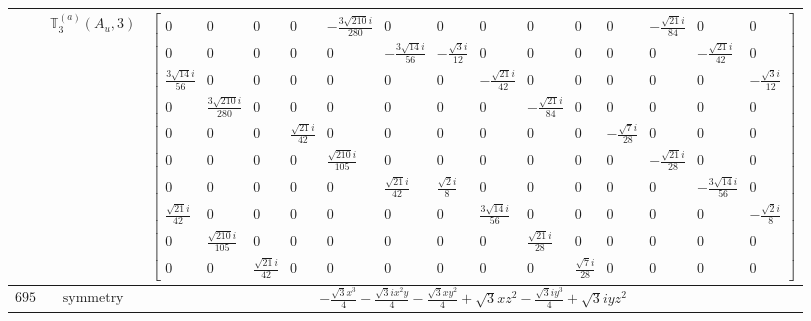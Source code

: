 \documentclass[fleqn,8pt,landscape]{jsarticle}
\begin{document}
\begin{longtable}{ccc}
$  $ & $ \mathbb{T}_{3}^{(a)}(A_{u},3) $ & $ \begin{bmatrix} 0 & 0 & 0 & 0 & - \frac{3 \sqrt{210} i}{280} & 0 & 0 & 0 & 0 & 0 & 0 & - \frac{\sqrt{21} i}{84} & 0 & 0 \\ 0 & 0 & 0 & 0 & 0 & - \frac{3 \sqrt{14} i}{56} & - \frac{\sqrt{3} i}{12} & 0 & 0 & 0 & 0 & 0 & - \frac{\sqrt{21} i}{42} & 0 \\ \frac{3 \sqrt{14} i}{56} & 0 & 0 & 0 & 0 & 0 & 0 & - \frac{\sqrt{21} i}{42} & 0 & 0 & 0 & 0 & 0 & - \frac{\sqrt{3} i}{12} \\ 0 & \frac{3 \sqrt{210} i}{280} & 0 & 0 & 0 & 0 & 0 & 0 & - \frac{\sqrt{21} i}{84} & 0 & 0 & 0 & 0 & 0 \\ 0 & 0 & 0 & \frac{\sqrt{21} i}{42} & 0 & 0 & 0 & 0 & 0 & 0 & - \frac{\sqrt{7} i}{28} & 0 & 0 & 0 \\ 0 & 0 & 0 & 0 & \frac{\sqrt{210} i}{105} & 0 & 0 & 0 & 0 & 0 & 0 & - \frac{\sqrt{21} i}{28} & 0 & 0 \\ 0 & 0 & 0 & 0 & 0 & \frac{\sqrt{21} i}{42} & \frac{\sqrt{2} i}{8} & 0 & 0 & 0 & 0 & 0 & - \frac{3 \sqrt{14} i}{56} & 0 \\ \frac{\sqrt{21} i}{42} & 0 & 0 & 0 & 0 & 0 & 0 & \frac{3 \sqrt{14} i}{56} & 0 & 0 & 0 & 0 & 0 & - \frac{\sqrt{2} i}{8} \\ 0 & \frac{\sqrt{210} i}{105} & 0 & 0 & 0 & 0 & 0 & 0 & \frac{\sqrt{21} i}{28} & 0 & 0 & 0 & 0 & 0 \\ 0 & 0 & \frac{\sqrt{21} i}{42} & 0 & 0 & 0 & 0 & 0 & 0 & \frac{\sqrt{7} i}{28} & 0 & 0 & 0 & 0 \end{bmatrix} $ \\ \hline
$ 695 $ & $ \text{symmetry} $ & $ - \frac{\sqrt{3} x^{3}}{4} - \frac{\sqrt{3} i x^{2} y}{4} - \frac{\sqrt{3} x y^{2}}{4} + \sqrt{3} x z^{2} - \frac{\sqrt{3} i y^{3}}{4} + \sqrt{3} i y z^{2} $ \\

\end{longtable}
\end{document}
